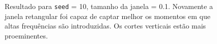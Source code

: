\begin{figure}[ht!]
	\vspace{1mm}
	\begin{center}
	\end{center}
	\vspace{1mm}
	\caption{Resultado para \texttt{seed} = 10, tamanho da janela = 0.1. Novamente a janela retangular foi capaz de captar melhor os momentos em que altas frequências são introduzidas. Os cortes verticais estão mais proeminentes.}
	\label{fig:seed10_0.1}
\end{figure}
